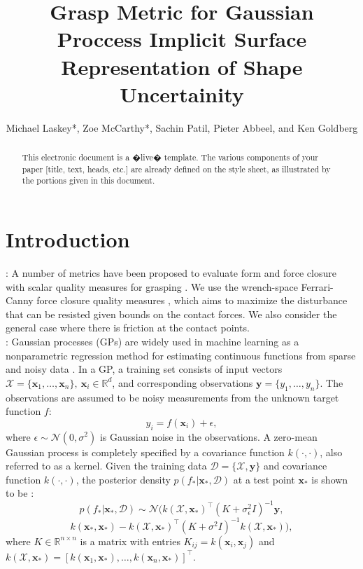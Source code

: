 \documentclass[letterpaper, 10 pt, conference]{ieeeconf}  %
\title{\LARGE \bf
Grasp Metric for Gaussian Proccess Implicit Surface Representation of Shape Uncertainity }
\author{Michael Laskey*, Zoe McCarthy*, Sachin Patil, Pieter Abbeel, and Ken Goldberg}%
\newcommand{\by}{\mathbf{y}}
\newcommand{\bx}{\mathbf{x}}
\newcommand{\mX}{\mathcal{X}}
\newcommand{\mD}{\mathcal{D}}
\newcommand{\mN}{\mathcal{N}}
\begin{document}
\maketitle
\thispagestyle{empty}
\pagestyle{empty}


\begin{abstract}

This electronic document is a �live� template. The various components of your paper [title, text, heads, etc.] are already defined on the style sheet, as illustrated by the portions given in this document.

\end{abstract}


\section{Introduction}

\vspace{10pt}
: A number of metrics have been proposed to evaluate form and force closure with scalar quality measures for grasping \cite{bicchi2000}.
We use the wrench-space Ferrari-Canny force closure quality measures \cite{ferrari1992}, which aims to maximize the disturbance that can be resisted given bounds on the contact forces.
We also consider the general case where there is friction at the contact points.\\


: Gaussian processes (GPs) are widely used in machine learning as a nonparametric regression method for estimating continuous functions from sparse and noisy data \cite{rasmussen2006}.
In a GP, a training set consists of input vectors $\mX = \{\bx_1, \ldots, \bx_n\}, ~\bx_i \in \mathbb{R}^d$, and corresponding observations $\by = \{y_1, \ldots, y_n\}$.
The observations are assumed to be noisy measurements from the unknown target function $f$:
\begin{equation}
y_i = f(\bx_i) + \epsilon,
\end{equation}
where $\epsilon \sim \mN(0,\sigma^2)$ is Gaussian noise in the observations.
A zero-mean Gaussian process is completely specified by a covariance function $k(\cdot,\cdot)$, also referred to as a kernel.
Given the training data $\mD = \{\mX, \by\}$ and covariance function $k(\cdot,\cdot)$, the posterior density $p(f_*|\bx_*,\mD)$ at a test point $\bx_{*}$ is shown to be \cite{rasmussen2006}:
\begin{equation}
  p(f_*|\bx_*,\mD) 
  \sim 
  \mN\big(k(\mX,\bx_*)^{\intercal}(K + \sigma_{\epsilon}^2I)^{-1}\by,
\end{equation}
\[
  k(\bx_*,\bx_*)-k(\mX,\bx_*)^{\intercal}(K+\sigma^2I)^{-1}k(\mX,\bx_*)\big), \label{eq:GPposterior}
\]
where $K \in \mathbb{R}^{n \times n}$ is a matrix with entries $K_{ij} = k(\bx_i,\bx_j)$ and $k(\mX,\bx_*) = [k(\bx_1,\bx_*),\ldots,k(\bx_n,\bx_*)]^{\intercal}$. 
\end{document}
